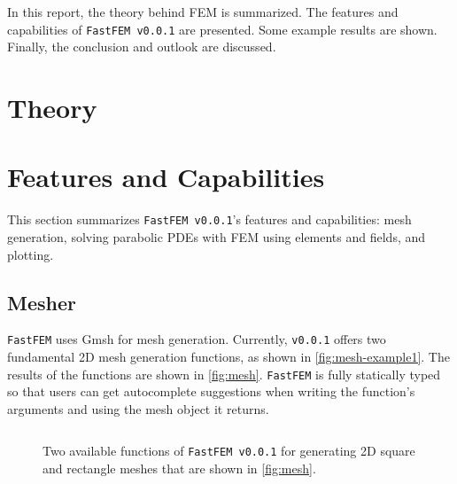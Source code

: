 \documentclass[headings=standardclasses, abstract=true]{scrartcl}
\newcommand{\pythonCodeBlock}[3]{%
    \begin{figure}
        \centering
        \begin{pythonbox}
            \inputminted[fontfamily=VSCode, fontsize=\scriptsize]{python}{#1}
        \end{pythonbox}
        \caption{#2}
        \label{#3}
    \end{figure}
}
\begin{document}
In this report, the theory behind FEM is summarized. The features and capabilities of \texttt{FastFEM v0.0.1} are presented. Some example results are shown. Finally, the conclusion and outlook are discussed.

\section{Theory}

\section{Features and Capabilities}

This section summarizes \texttt{FastFEM v0.0.1}'s features and capabilities: mesh generation, solving parabolic PDEs with FEM using elements and fields, and plotting.

\subsection{Mesher}

\texttt{FastFEM} uses Gmsh\supercite{Gmsh} for mesh generation. Currently, \texttt{v0.0.1} offers two fundamental 2D mesh generation functions, as shown in \autoref{fig:mesh-example1}.  The results of the functions are shown in \autoref{fig:mesh}. \texttt{FastFEM} is fully statically typed so that users can get autocomplete suggestions when writing the function's arguments and using the mesh object it returns.

\pythonCodeBlock{figures/mesher-example1.py}{Two available functions of \texttt{FastFEM v0.0.1} for generating 2D square and rectangle meshes that are shown in \autoref{fig:mesh}.}{fig:mesh-example1}
\end{document}
